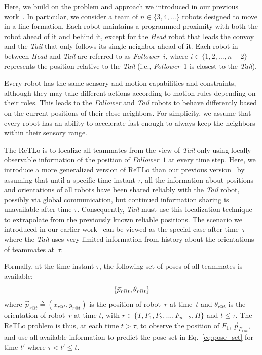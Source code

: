 \documentclass[letterpaper, 10 pt, conference]{ieeeconf}  %
\begin{document}
    Here, we build on the problem and approach we introduced in our previous
    work~\cite{CPR17}. In particular, we consider a team of $n \in
    \{3,4,\dots\}$ robots designed to move in a line formation.
    Each robot maintains a programmed
    proximity with both the robot ahead of it and behind it, except for
    the \emph{Head} robot that leads the convoy and the \emph{Tail}
    that only follows its single neighbor ahead of it. Each robot in
    between \emph{Head} and \emph{Tail} are referred to as
    \emph{Follower}~$i$, where $i \in \{1, 2, \dots, n-2\}$ represents
    the position relative to the \emph{Tail} (i.e., \emph{Follower}~1 is
    closest to the \emph{Tail}).

    Every robot has the same sensory and motion capabilities and
    constraints, although they may take different actions according to
    motion rules depending on their roles. This leads to the
    \emph{Follower} and \emph{Tail} robots to behave differently based
    on the current positions of their close neighbors. For simplicity,
    we assume that every robot has an ability to accelerate fast enough
    to always keep the neighbors within their sensory range.

    The ReTLo is to localize all teammates from the view of \emph{Tail}
    only using locally observable information of the position
    of \emph{Follower}~$1$ at every time step. Here, we introduce a
    more generalized version of ReTLo than our previous
    version~\cite{CPR17} by assuming that until a specific time instant
    $\tau$, all the information about
    positions and orientations of all robots have been shared reliably 
    with the \emph{Tail} robot, possibly via global communication, but
    continued information sharing is unavailable after time $\tau$.
    Consequently, \emph{Tail} must use this localization technique to
    extrapolate from the previously known reliable positions. The
    scenario we introduced in our earlier work~\cite{CPR17} can be
    viewed as the special case after time~$\tau$ where
    the \emph{Tail} uses very limited information from history
    about the orientations of teammates at~$\tau$.

    Formally, at the time instant $\tau$, the following set of poses of
    all teammates is available:
	\begin{equation}
		\{\vec{p}_{r@t},\theta_{r@t}\} \\
	    \label{eq:pose_set}
	\end{equation}
    where $\vec{p}_{r@t} \triangleq (x_{r@t}, y_{r@t})$ is the position
    of robot~$r$ at time~$t$ and $\theta_{r@t}$ is the orientation of
    robot~$r$ at time $t$, with $r \in \{T, F_{1}, F_{2}, ..., F_{n-2},
    H\}$ and $t \leq \tau$. The ReTLo problem is thus, at each time $t >
    \tau$, to observe the position of $F_1$, $\vec{p}_{F_{1@t}}$, and
    use all available information to predict the pose set in
    Eq.~\eqref{eq:pose_set} for time $t'$ where $ \tau < t' \leq t$.
\end{document}
